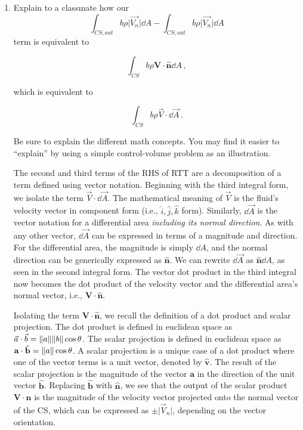 \documentclass[../main.tex]{subfiles}
\begin{document}
\begin{enumerate}[label = (\alph*)]
    \item Explain to a classmate how our 
        \[
            \int_{CS,out} b \rho \lvert{\vec{V_n}}\rvert \dd A -%
            \int_{CS,out} b \rho \lvert{\vec{V_n}}\rvert \dd A
        \]
        term is equivalent to

        \[
            \int_{CS} b \rho \boldsymbol{V} \cdot \hat{\boldsymbol{n}} \dd A \, ,
        \]

        which is equivalent to

        \[
            \int_{CS} b \rho \vec{V} \cdot \dd \vec{A} \, .
        \]

        Be sure to explain the different math concepts. You may find it easier to ``explain'' by using a simple control-volume problem as an illustration.
        
        The second and third terms of the RHS of RTT are a decomposition of a term defined using vector notation.
        Beginning with the third integral form, we isolate the term \(\vec{V} \cdot \dd \vec{A}\).
        The mathematical meaning of \(\vec{V}\) is the fluid's velocity vector in component form (i.e., \(\hat{i}, \hat{j}, \hat{k}\) form).
        Similarly, \(\dd \vec{A}\) is the vector notation for a differential area \textit{including its normal direction}.
        As with any other vector, \(\dd \vec{A}\) can be expressed in terms of a magnitude and direction.
        For the differential area, the magnitude is simply \(\dd A\), and the normal direction can be generically expressed as \(\hat{\mathbf{n}}\).
        We can rewrite \(\dd \vec{A}\) as \(\hat{\mathbf{n}} \dd A\), as seen in the second integral form.
        The vector dot product in the third integral now becomes the dot product of the velocity vector and the differential area's normal vector, i.e., \(\mathbf{V} \cdot \hat{\mathbf{n}}\).

        Isolating the term \(\mathbf{V} \cdot \hat{\mathbf{n}}\), we recall the definition of a dot product and scalar projection. 
        The dot product is defined in euclidean space as \(\vec{a} \cdot \vec{b} = \norm{a}\norm{b}\cos{\theta}\).
        The scalar projection is defined in euclidean space as \(\mathbf{a} \cdot \hat{\mathbf{b}} = \norm{a} \cos\theta\).
        A scalar projection is a unique case of a dot product where one of the vector terms is a unit vector, denoted by \(\hat{\mathbf{v}}\).
        The result of the scalar projection is the magnitude of the vector \(\mathbf{a}\) in the direction of the unit vector \(\hat{\mathbf{b}}\).
        Replacing \(\hat{\mathbf{b}}\) with \(\hat{\mathbf{n}}\), we see that the output of the scalar product \(\mathbf{V} \cdot \hat{\mathbf{n}}\) is the magnitude of the velocity vector projected onto the normal vector of the CS, which can be expressed as \(\pm\lvert\vec{V}_n\rvert\), depending on the vector orientation.


\end{enumerate}
\end{document}
